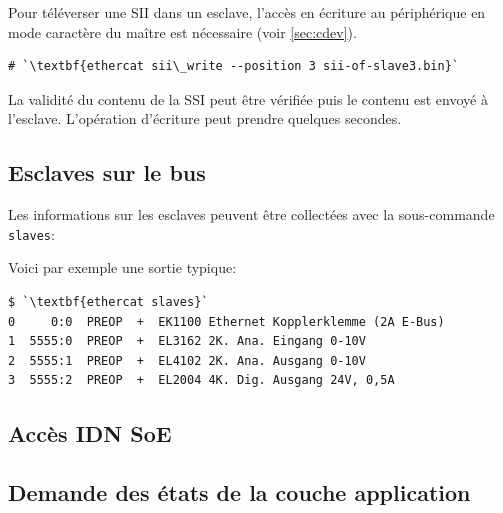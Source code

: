\documentclass[a4paper,12pt,BCOR6mm,bibtotoc,idxtotoc]{scrbook}
\begin{document}
Pour t\'el\'everser une SII dans un esclave, l'acc\`es en \'ecriture
au p\'eriph\'erique en mode caract\`ere du ma\^itre est n\'ecessaire
(voir \autoref{sec:cdev}).



\begin{lstlisting}
# `\textbf{ethercat sii\_write --position 3 sii-of-slave3.bin}`
\end{lstlisting}

La validit\'e du contenu de la SSI peut \^etre v\'erifi\'ee puis le
contenu est envoy\'e \`a l'esclave.  L'op\'eration d'\'ecriture peut
prendre quelques secondes.


\subsection{Esclaves sur le bus}

Les informations sur les esclaves peuvent \^etre collect\'ees avec la
sous-commande \lstinline+slaves+:



Voici par exemple une sortie typique:

\begin{lstlisting}
$ `\textbf{ethercat slaves}`
0     0:0  PREOP  +  EK1100 Ethernet Kopplerklemme (2A E-Bus)
1  5555:0  PREOP  +  EL3162 2K. Ana. Eingang 0-10V
2  5555:1  PREOP  +  EL4102 2K. Ana. Ausgang 0-10V
3  5555:2  PREOP  +  EL2004 4K. Dig. Ausgang 24V, 0,5A
\end{lstlisting}


\subsection{Acc\`es IDN SoE}
\label{sec:soeaccess}






\subsection{Demande des \'etats de la couche application}
\end{document}
